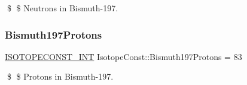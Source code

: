 \$ \$ Neutrons in Bismuth-\/197. \mbox{\label{group___isotope_const-_bismuth-_bi197_gafbb0de473004a830813572794f72aee4}} 
\subsubsection{\texorpdfstring{Bismuth197\+Protons}{Bismuth197Protons}}
{\footnotesize\ttfamily \mbox{\hyperlink{group___isotope_const-_macros_ga5f18360b3e99483a35c32d789e62621c}{I\+S\+O\+T\+O\+P\+E\+C\+O\+N\+S\+T\+\_\+\+I\+NT}} Isotope\+Const\+::\+Bismuth197\+Protons = 83}

\$ \$ Protons in Bismuth-\/197. 